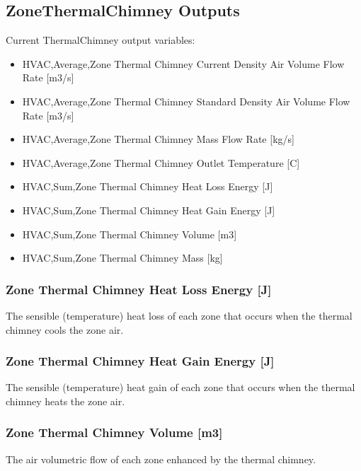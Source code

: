 \subsection{ZoneThermalChimney Outputs}\label{zonethermalchimney-outputs}

Current ThermalChimney output variables:

\begin{itemize}
\item
  HVAC,Average,Zone Thermal Chimney Current Density Air Volume Flow Rate {[}m3/s{]}
\item
  HVAC,Average,Zone Thermal Chimney Standard Density Air Volume Flow Rate {[}m3/s{]}
\item
  HVAC,Average,Zone Thermal Chimney Mass Flow Rate {[}kg/s{]}
\item
  HVAC,Average,Zone Thermal Chimney Outlet Temperature {[}C{]}
\item
  HVAC,Sum,Zone Thermal Chimney Heat Loss Energy {[}J{]}
\item
  HVAC,Sum,Zone Thermal Chimney Heat Gain Energy {[}J{]}
\item
  HVAC,Sum,Zone Thermal Chimney Volume {[}m3{]}
\item
  HVAC,Sum,Zone Thermal Chimney Mass {[}kg{]}
\end{itemize}

\subsubsection{Zone Thermal Chimney Heat Loss Energy {[}J{]}}\label{zone-thermal-chimney-heat-loss-energy-j}

The sensible (temperature) heat loss of each zone that occurs when the thermal chimney cools the zone air.

\subsubsection{Zone Thermal Chimney Heat Gain Energy {[}J{]}}\label{zone-thermal-chimney-heat-gain-energy-j}

The sensible (temperature) heat gain of each zone that occurs when the thermal chimney heats the zone air.

\subsubsection{Zone Thermal Chimney Volume {[}m3{]}}\label{zone-thermal-chimney-volume-m3}

The air volumetric flow of each zone enhanced by the thermal chimney.

